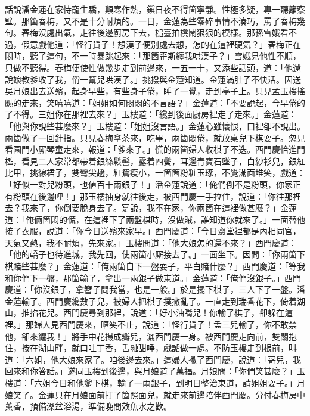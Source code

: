 話說潘金蓮在家恃寵生驕，顛寒作熱，鎭日夜不得箇寧靜。性極多疑，專一聽籬察壁。那箇春梅，又不是十分耐煩的。一日，金蓮為些零碎事情不湊巧，罵了春梅幾句。春梅沒處出氣，走往後邊廚房下去，槌臺拍櫈鬧狠狠的模樣。那孫雪娥看不過，假意戲他道：「怪行貨子！想漢子便別處去想，怎的在這裡硬氣？」{}春梅正在悶時，聽了這句，不一時暴跳起來：「那箇歪斯纏我哄漢子？」雪娥見他性不順，只做不聽得。春梅便使性做幾步走到前邊來，一五一十，又添些話頭，道：「他還說娘教爹收了我，俏一幫兒哄漢子。」挑撥與金蓮知道。金蓮滿肚子不快活。因送吳月娘出去送殯，起身早些，有些身子倦，睡了一覺，走到亭子上。只見孟玉樓搖颭的走來，{}笑嘻嘻道：「姐姐如何悶悶的不言語？」金蓮道：「不要說起，今早倦的了不得。三姐你在那裡去來？」玉樓道：「纔到後面廚房裡走了走來。」金蓮道：「他與你說些甚麼來？」玉樓道：「姐姐沒言語。」金蓮心雖懷恨，口裡卻不說出。兩箇做了一回針指。只見春梅拿茶來，吃畢，兩箇悶倦，就放桌兒下棋耍子。忽見看園門小厮琴童走來，{}報道：「爹來了。」慌的兩箇婦人收棋子不迭。西門慶恰進門檻，看見二人家常都帶着銀絲鬏髻，露着四鬢，耳邊青寶石墜子，白紗衫兒，銀紅比甲，挑線裙子，雙彎尖趫，紅鴛瘦小，一箇箇粉粧玉琢，不覺滿面堆笑，戲道：「好似一對兒粉頭，也値百十兩銀子！」潘金蓮說道：「俺們倒不是粉頭，你家正有粉頭在後邊哩！」{}那玉樓抽身就往後走，被西門慶一手拉住，說道：「你往那裡去？我來了，你倒要脫身去了。寔說，我不在家，你兩箇在這裡做甚麼？」金蓮道：「俺倆箇悶的慌，在這裡下了兩盤棋時，沒做賊，誰知道你就來了。」一面替他接了衣服，說道：「你今日送殯來家早。」西門慶道：「今日齋堂裡都是內相同官，天氣又熱，我不耐煩，先來家。」玉樓問道：「他大娘怎的還不來？」西門慶道：「他的轎子也待進城，我先回，使兩箇小厮接去了。」一面坐下。因問：「你兩箇下棋賭些甚麼？」金蓮道：「俺兩箇自下一盤耍子，平白賭什麼？」西門慶道：「等我和你們下一盤，那箇輸了，拿出一兩銀子做東道。」金蓮道：「俺們沒銀子。」西門慶道：「你沒銀子，拿簪子問我當，也是一般。」於是擺下棋子，三人下了一盤。潘金蓮輸了。{}西門慶纔數子兒，被婦人把棋子撲撒亂了。一直走到瑞香花下，倚着湖山，推掐花兒。西門慶尋到那裡，說道：「好小油嘴兒！你輸了棋子，卻躲在這裡。」那婦人見西門慶來，暱笑不止，說道：「怪行貨子！孟三兒輸了，你不敢禁他，卻來纏我！」將手中花撮成瓣兒，灑西門慶一身。{}被西門慶走向前，雙關抱住，按在湖山畔，就口吐丁香，舌融甜唾，戲謔做一處。不防玉樓走到根前，叫道：「六姐，他大娘來家了。咱後邊去來。」這婦人撇了西門慶，說道：「哥兒，我回來和你答話。」{}遂同玉樓到後邊，與月娘道了萬福。月娘問：「你們笑甚麼？」玉樓道：「六姐今日和他爹下棋，輸了一兩銀子，到明日整治東道，請姐姐耍子。」月娘笑了。金蓮只在月娘面前打了箇照面兒，就走來前邊陪伴西門慶。分付春梅房中薰香，預備澡盆浴湯，準備晚間效魚水之歡。

